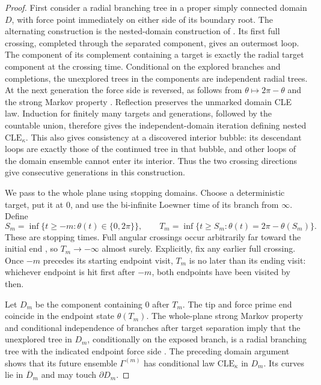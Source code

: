 \begin{proof}
First consider a radial branching tree in a proper simply connected
domain $D$, with force point immediately on either side of its boundary
root.  The alternating construction is the nested-domain construction
of \cite[Section~2.1.6]{AruHoldenPowellSunCritical}.  Its first full
crossing, completed through the separated component, gives an outermost
loop.  The component of its complement containing a target is exactly
the radial target component at the crossing time.  Conditional on the
explored branches and completions, the unexplored trees in the
components are independent radial trees.  At the next generation the
force side is reversed, as follows from $\theta\mapsto2\pi-\theta$
and the strong Markov property
\cite[Remark~2.3]{AruHoldenPowellSunCritical}.  Reflection preserves the
unmarked domain CLE law.  Induction for finitely many targets and
generations, followed by the countable union, therefore gives the
independent-domain iteration defining nested $\mathrm{CLE}_{\kappa}$.
This also gives consistency at a discovered interior bubble: its
descendant loops are exactly those of the continued tree in that bubble,
and other loops of the domain ensemble cannot enter its interior.
Thus the two crossing directions give consecutive generations in this
construction.

We pass to the whole plane using stopping domains.  Choose a
deterministic target, put it at $0$, and use the bi-infinite Loewner
time of its branch from $\infty$.  Define
\[
 S_m=\inf\{t\ge -m:\theta(t)\in\{0,2\pi\}\},\qquad
 T_m=\inf\{t\ge S_m:\theta(t)=2\pi-\theta(S_m)\}.
\]
These are stopping times.  Full angular crossings occur arbitrarily
far toward the initial end
\cite[Lemma~2.7]{GwynneMillerQianCLE}, so $T_m\to-\infty$ almost
surely.  Explicitly, fix any earlier full crossing.  Once $-m$ precedes
its starting endpoint visit, $T_m$ is no later than its ending visit:
whichever endpoint is hit first after $-m$, both endpoints have been
visited by then.

Let $D_m$ be the component containing $0$ after $T_m$.  The tip and
force prime end coincide in the endpoint state $\theta(T_m)$.
The whole-plane strong Markov property and conditional
independence of branches after target separation imply that the
unexplored tree in $D_m$, conditionally on the exposed branch, is a
radial branching tree with the indicated endpoint force side
\cite[Proposition~2.2 and Section~2.1.3]{MillerSheffieldIGIV}.
The preceding domain argument shows that its future ensemble
$\Gamma^{(m)}$ has conditional law $\mathrm{CLE}_{\kappa}$ in $D_m$.
Its curves lie in $\overline D_m$ and may touch $\partial D_m$.


\end{proof}
